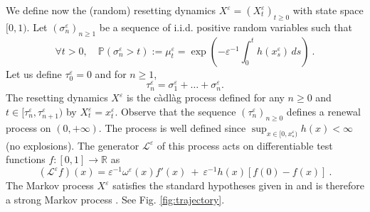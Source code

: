 \documentclass[reqno, 12pt, a4paper]{amsart}
\theoremstyle{plain}
\theoremstyle{definition}
\begin{document}
\bigskip

We define now the (random) resetting dynamics ${X}^\varepsilon =( {X}^\varepsilon_t)_{t \ge 0}$  with state space $[0,1)$. Let $(\sigma_n^\varepsilon)_{n \ge 1}$ be a sequence of i.i.d. positive random variables such that 
\begin{equation}
\label{eq:mu_t_def}
\forall t > 0, \quad \mathbb P (\sigma^\varepsilon_n > t) := \mu_t^\varepsilon = \exp\left( -{\varepsilon}^{-1}  \int_0^t h(x^\varepsilon_s) \, ds \right) \ .
\end{equation}
Let us define $\tau^\varepsilon_0=0$ and for $n\ge 1$, 
\begin{equation}
\label{spike_times}
\tau^\varepsilon_n= \sigma^\varepsilon_1+ \ldots+\sigma^\varepsilon_n.
\end{equation} 
The resetting dynamics $X^\varepsilon$ is the c\`adl\`ag process defined for any $n \ge 0$ and $t \in [\tau^\varepsilon_n,\tau^\varepsilon_{n+1})$ by $X^\varepsilon_t = {x}^\varepsilon_t$. Observe that the sequence $(\tau^\varepsilon_n)_{n\ge 0}$ defines a renewal process on $(0,+\infty)$. The process is well defined since $\sup_{x \in [0,x^\varepsilon_*)} h(x) < \infty$ (no explosions). The generator $\mathcal L^\varepsilon$ of this process acts on differentiable test functions $f: [0,1] \to \mathbb R$ as 
\begin{equation}
\label{eq:generator}
(\mathcal L^\varepsilon f )(x) = {\varepsilon}^{-1}  \omega^\varepsilon (x)   f' (x) \ + \ {\varepsilon}^{-1} h(x)  \left[  f(0) - f(x) \right] \ . 
\end{equation}
The Markov process $X^\varepsilon$ satisfies the standard hypotheses given in \cite[p. 62, standard conditions 24.8]{Davies93} and is therefore a strong Markov process \cite[Theorem 25.5, p.64]{Davies93}. See Fig. \ref{fig:trajectory}.
\end{document}

